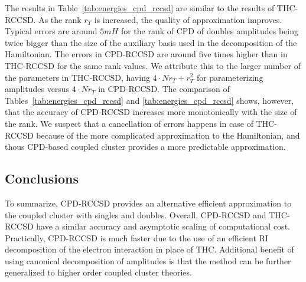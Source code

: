 The results in Table~\ref{tab:energies_cpd_rccsd} are similar to the results
of THC-RCCSD. As the rank $r_{T}$ is increased, the quality of approximation 
improves. Typical errors are around $5 mH$ for the rank of CPD of doubles 
amplitudes being twice bigger than the size of the auxiliary basis used in the 
decomposition of the Hamiltonian. The errors in CPD-RCCSD are around five times 
higher than in THC-RCCSD for the same rank values. We attribute this to the 
larger number of the parameters in THC-RCCSD, having $4 \cdot N r_{T} + 
r^{2}_{T}$ for parameterizing amplitudes versus $4 \cdot N r_{T}$ in CPD-RCCSD. 
The comparison of Tables~\ref{tab:energies_cpd_rccsd} and 
\ref{tab:energies_cpd_rccsd} shows, however, that the accuracy of CPD-RCCSD 
increases more monotonically with the size of the rank. We suspect that a 
cancellation of errors happens in case of THC-RCCSD because of the more 
complicated approximation to the Hamiltonian, and thous CPD-based coupled 
cluster provides a more predictable approximation.

\subsection{Conclusions}
To summarize, CPD-RCCSD provides an alternative efficient approximation to the 
coupled cluster with singles and doubles. Overall, CPD-RCCSD and THC-RCCSD 
have a similar accuracy and asymptotic scaling of computational cost. 
Practically, CPD-RCCSD is much faster due to the use of an efficient RI 
decomposition of the electron interaction in place of THC. Additional benefit 
of using canonical decomposition of amplitudes is that the method can be 
further generalized to higher order coupled cluster theories.

